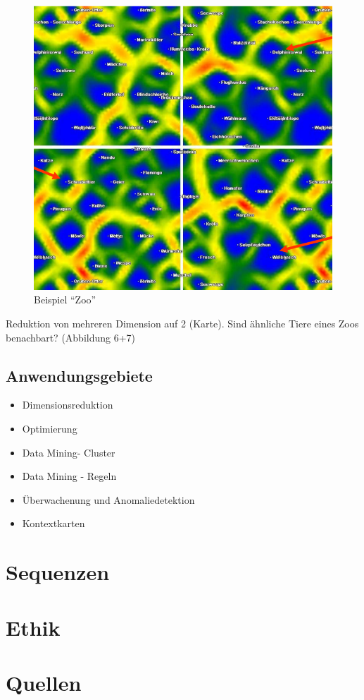 \documentclass[11pt]{article}
\begin{document}
    \begin{figure}[ht!]
        \centering
        \includegraphics[width=12cm]{../../resources/zoo.png}
        \caption{Beispiel "`Zoo"'}
    \end{figure}
    Reduktion von mehreren Dimension auf 2 (Karte). Sind ähnliche Tiere eines Zoos benachbart?
    (Abbildung 6+7)

    \subsection{Anwendungsgebiete}
    \begin{itemize}
        \item Dimensionsreduktion
        \item Optimierung
        \item Data Mining- Cluster
        \item Data Mining - Regeln
        \item Überwachenung und Anomaliedetektion
        \item Kontextkarten
    \end{itemize}

    \section{Sequenzen}


    \section{Ethik}


    \section{Quellen}
\end{document}
